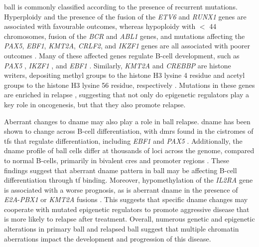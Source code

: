 \Gls{ball} is commonly classified according to the presence of recurrent mutations.
Hyperploidy and the presence of the fusion of the \emph{ETV6} and \emph{RUNX1} genes are associated with favourable outcomes, whereas hypoploidy with $<$ 44 chromosomes, fusion of the \emph{BCR} and \emph{ABL1} genes, and mutations affecting the \emph{PAX5}, \emph{EBF1}, \emph{KMT2A}, \emph{CRLF2}, and \emph{IKZF1} genes are all associated with poorer outcomes \cite{inabaAcuteLymphoblasticLeukaemia2013,hungerAcuteLymphoblasticLeukemia2015}.
Many of these affected genes regulate B-cell development, such as \emph{PAX5} \cite{liuPax5LossImposes2014,dangPAX5TumorSuppressor2015,mullighanGenomewideAnalysisGenetic2007}, \emph{IKZF1} \cite{mullighanGenomewideAnalysisGenetic2007}, and \emph{EBF1} \cite{bollerDefiningCellChromatin2018,nuttTranscriptionalRegulationCell2007}.
Similarly, \emph{KMT2A} and \emph{CREBBP} are histone writers, depositing methyl groups to the histone H3 lysine 4 residue and acetyl groups to the histone H3 lysine 56 residue, respectively \cite{slanyMLLFusionProteins2020,krivtsovMLLTranslocationsHistone2007,raoHijackedCancerKMT22015,parkPHD3DomainMLL2010,liStructuralBasisActivity2016,dasBindingHistoneChaperone2014}.
Mutations in these genes are enriched in relapse \cite{hungerAcuteLymphoblasticLeukemia2015,mullighanGenomicAnalysisClonal2008}, suggesting that not only do epigenetic regulators play a key role in oncogenesis, but that they also promote relapse.

Aberrant changes to \gls{dname} may also play a role in \gls{ball} relapse.
\Gls{dname} has been shown to change across B-cell differentiation, with \glspl{dmr} found in the cistromes of \glspl{tf} that regulate differentiation, including \emph{EBF1} and \emph{PAX5} \cite{leeGlobalDNAMethylation2012}.
Additionally, the \gls{dname} profile of \gls{ball} cells differ at thousands of loci across the genome, compared to normal B-cells, primarily in bivalent \glspl{cre} and promoter regions \cite{leeEpigeneticRemodelingBcell2015,nordlundGenomewideSignaturesDifferential2013}.
These findings suggest that aberrant \gls{dname} pattern in \gls{ball} may be affecting B-cell differentiation through \gls{tf} binding.
Moreover, hypomethylation of the \emph{IL2RA} gene is associated with a worse prognosis, as is aberrant \gls{dname} in the presence of \emph{E2A}-\emph{PBX1} or \emph{KMT2A} fusions \cite{gengIntegrativeEpigenomicAnalysis2012}.
This suggests that specific \gls{dname} changes may cooperate with mutated epigenetic regulators to promote aggressive disease that is more likely to relapse after treatment.
Overall, numerous genetic and epigenetic alterations in primary \gls{ball} and relapsed \gls{ball} suggest that multiple chromatin aberrations impact the development and progression of this disease.

